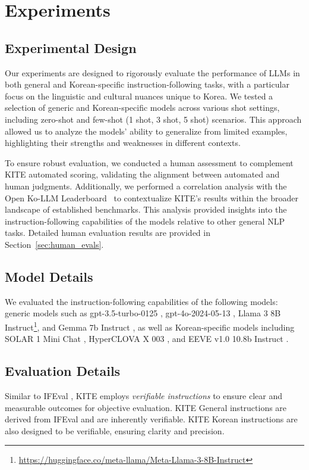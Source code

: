     \section{Experiments}
    \subsection{Experimental Design}
    Our experiments are designed to rigorously evaluate the performance of LLMs in both general and Korean-specific instruction-following tasks, with a particular focus on the linguistic and cultural nuances unique to Korea. We tested a selection of generic and Korean-specific models across various shot settings, including zero-shot and few-shot (1 shot, 3 shot, 5 shot) scenarios. This approach allowed us to analyze the models' ability to generalize from limited examples, highlighting their strengths and weaknesses in different contexts.

    To ensure robust evaluation, we conducted a human assessment to complement KITE automated scoring, validating the alignment between automated and human judgments. Additionally, we performed a correlation analysis with the Open Ko-LLM Leaderboard~\cite{park2024open} to contextualize KITE’s results within the broader landscape of established benchmarks. This analysis provided insights into the instruction-following capabilities of the models relative to other general NLP tasks. Detailed human evaluation results are provided in Section~\ref{sec:human_evals}.

    \subsection{Model Details}
    We evaluated the instruction-following capabilities of the following models: generic models such as gpt-3.5-turbo-0125 \cite{brown2020language}, gpt-4o-2024-05-13 \cite{achiam2023gpt}, Llama 3 8B Instruct\footnote{\url{https://huggingface.co/meta-llama/Meta-Llama-3-8B-Instruct}}, and Gemma 7b Instruct \cite{team2024gemma}, as well as Korean-specific models including SOLAR 1 Mini Chat \cite{kim2023solar}, HyperCLOVA X 003 \cite{yoo2024hyperclova}, and EEVE v1.0 10.8b Instruct \cite{kim2024efficient}.

    \subsection{Evaluation Details}
    \label{sec:evaluation_details}
    Similar to IFEval \cite{zhou2023instruction}, KITE employs \textit{verifiable instructions} to ensure clear and measurable outcomes for objective evaluation. KITE General instructions are derived from IFEval and are inherently verifiable. KITE Korean instructions are also designed to be verifiable, ensuring clarity and precision.

